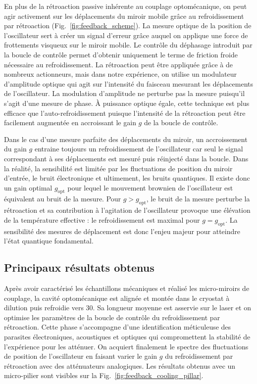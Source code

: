 \documentclass[12pt,a4paper]{article}
\begin{document}
En plus de la rétroaction passive inhérente au couplage optomécanique, on peut agir activement sur les déplacements du miroir mobile grâce au refroidissement par rétroaction (Fig.~\ref{fig:feedback_scheme}).
La mesure optique de la position de l'oscillateur sert à créer un signal d'erreur grâce auquel on applique une force de frottements visqueux sur le miroir mobile.
Le contrôle du déphasage introduit par la boucle de contrôle permet d'obtenir uniquement le terme de friction froide nécessaire au refroidissement.
La rétroaction peut être appliquée grâce à de nombreux actionneurs, mais dans notre expérience, on utilise un modulateur d'amplitude optique qui agit sur l'intensité du faisceau mesurant les déplacements de l'oscillateur.
La modulation d'amplitude ne perturbe pas la mesure puisqu'il s'agit d'une mesure de phase. 
À puissance optique égale, cette technique est plus efficace que l'auto-refroidissement puisque l'intensité de la rétroaction peut être facilement augmentée en accroissant le gain $g$ de la boucle de contrôle.

Dans le cas d'une mesure parfaite des déplacements du miroir, un accroissement du gain $g$ entraine toujours un refroidissement de l'oscillateur car seul le signal correspondant à ses déplacements est mesuré puis réinjecté dans la boucle.
Dans la réalité, la sensibilité est limitée par les fluctuations de position du miroir d'entrée, le bruit électronique et ultimement, les bruits quantiques.
Il existe donc un gain optimal $g_\mathrm{opt}$ pour lequel le mouvement brownien de l'oscillateur est équivalent au bruit de la mesure.
Pour $g>g_\mathrm{opt}$, le bruit de la mesure perturbe la rétroaction et sa contribution à l'agitation de l'oscillateur provoque une élévation de la température effective : le refroidissement est maximal pour $g=g_\mathrm{opt}$.
La sensibilité des mesures de déplacement est donc l'enjeu majeur pour atteindre l'état quantique fondamental.

\subsection{Principaux résultats obtenus}
\label{sec:results}

Après avoir caractérisé les échantillons mécaniques et réalisé les micro-miroirs de couplage, la cavité optomécanique est alignée et montée dans le cryostat à dilution puis refroidie vers \unit{30}{\milli\kelvin}.
Sa longueur moyenne est asservie sur le laser et on optimise les paramètres de la boucle de contrôle du refroidissement par rétroaction.
Cette phase s'accompagne d'une identification méticuleuse des parasites électroniques, acoustiques et optiques qui compromettent la stabilité de l'expérience pour les atténuer.
On acquiert finalement le spectre des fluctuations de position de l'oscillateur en faisant varier le gain $g$ du refroidissement par rétroaction avec des atténuateurs analogiques.
Les résultats obtenus avec un micro-pilier sont visibles sur la Fig.~\ref{fig:feedback_cooling_pillar}.
\end{document}
